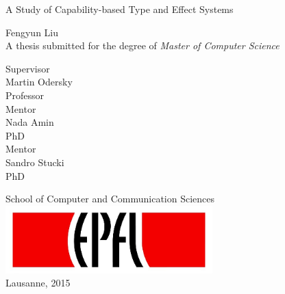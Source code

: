 \begin{titlepage}

  \begin{center}

    \vspace*{3\baselineskip}
    {\Large A Study of Capability-based Type and Effect Systems\\[2cm] }

    \noindent
    Fengyun Liu \\[2cm]

    \noindent
    A thesis submitted for the degree of \emph{Master of Computer Science} \\[2cm]

    \noindent
    \begin{multicols}{3}
    Supervisor \\
    Martin Odersky \\
    Professor \\
    \vfill
    \columnbreak
    Mentor \\
    Nada Amin \\
    PhD \\
    \vfill
    \columnbreak
    Mentor \\
    Sandro Stucki\\
    PhD \\
    \end{multicols}

    \vspace*{3\baselineskip}

    \noindent
    {School of Computer and Communication Sciences \\[1cm]}
    \includegraphics[width=0.6\textwidth]{img/epfl}~\\[1cm]
    \noindent
    Lausanne, 2015 \\[1cm]



  \end{center}

\end{titlepage}
